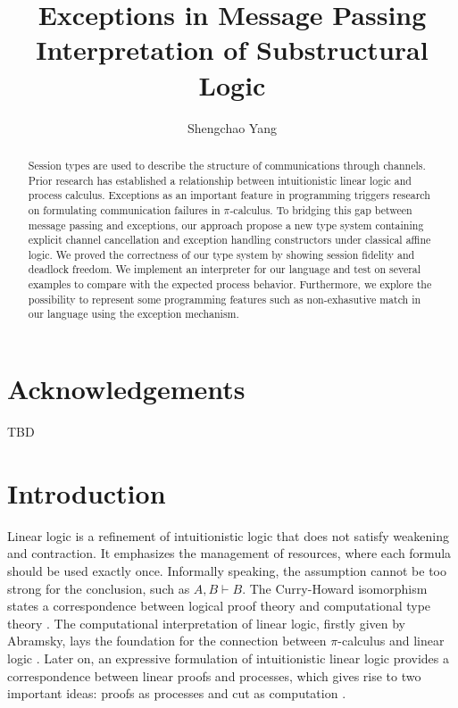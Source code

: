 \documentclass[12pt]{memoir}
\begin{document}
\frontmatter

\pagestyle{empty}

\title{\textbf{Exceptions in Message Passing Interpretation of Substructural Logic}}
\author{Shengchao Yang}


\maketitle

\pagestyle{nonumbers}

\begin{abstract}
  Session types are used to describe the structure of communications through
  channels. Prior research has established a relationship between intuitionistic
  linear logic and process calculus. 
  Exceptions as an important feature in programming triggers research on formulating communication failures in $\pi$-calculus.
  To bridging this gap between message passing and exceptions, 
  our approach propose a new type system containing explicit channel cancellation and exception handling constructors under classical affine logic.
  We proved the correctness of our type system by showing session fidelity and deadlock freedom. 
  We implement an interpreter for our language and test on several examples to compare with the expected process behavior.
  Furthermore, we explore the possibility to represent some programming features such as non-exhasutive match in our language using the exception mechanism. 
\end{abstract}

\chapter{Acknowledgements}

TBD

\cleardoublepage
\tableofcontents

\mainmatter

\chapter{Introduction}

Linear logic is a refinement of intuitionistic logic that does not satisfy weakening and contraction. 
It emphasizes the management of resources, where each formula should be used exactly once. 
Informally speaking, the assumption cannot be too strong for the conclusion, such as $A, B \vdash B$.
The Curry-Howard isomorphism states a correspondence between logical proof theory and computational type theory \citep{Howard1980}.
The computational interpretation of linear logic, firstly given by Abramsky, lays the foundation for the connection between $\pi$-calculus and linear logic \citep{Abramsky1933}. 
Later on, an expressive formulation of intuitionistic linear logic provides a correspondence between linear proofs and processes, 
which gives rise to two important ideas: proofs as processes and cut as computation \citep{Caires2014}.
\end{document}
